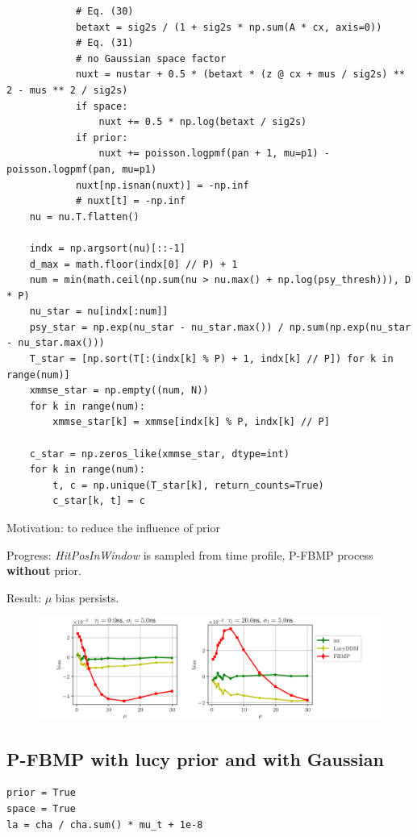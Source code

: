 \documentclass[notitlepage]{article}
\begin{document}
\begin{lstlisting}
            # Eq. (30)
            betaxt = sig2s / (1 + sig2s * np.sum(A * cx, axis=0))
            # Eq. (31)
            # no Gaussian space factor
            nuxt = nustar + 0.5 * (betaxt * (z @ cx + mus / sig2s) ** 2 - mus ** 2 / sig2s)
            if space:
                nuxt += 0.5 * np.log(betaxt / sig2s)
            if prior:
                nuxt += poisson.logpmf(pan + 1, mu=p1) - poisson.logpmf(pan, mu=p1)
            nuxt[np.isnan(nuxt)] = -np.inf
            # nuxt[t] = -np.inf
    nu = nu.T.flatten()

    indx = np.argsort(nu)[::-1]
    d_max = math.floor(indx[0] // P) + 1
    num = min(math.ceil(np.sum(nu > nu.max() + np.log(psy_thresh))), D * P)
    nu_star = nu[indx[:num]]
    psy_star = np.exp(nu_star - nu_star.max()) / np.sum(np.exp(nu_star - nu_star.max()))
    T_star = [np.sort(T[:(indx[k] % P) + 1, indx[k] // P]) for k in range(num)]
    xmmse_star = np.empty((num, N))
    for k in range(num):
        xmmse_star[k] = xmmse[indx[k] % P, indx[k] // P]
    
    c_star = np.zeros_like(xmmse_star, dtype=int)
    for k in range(num):
        t, c = np.unique(T_star[k], return_counts=True)
        c_star[k, t] = c
\end{lstlisting}

Motivation: to reduce the influence of prior

Progress: \textit{HitPosInWindow} is sampled from time profile, P-FBMP process \textbf{without} prior. 

Result: $\mu$ bias persists. 

\begin{figure}[H]
    \centering
    \includegraphics[width=\textwidth]{vs-biasmu-woprior.png}
\end{figure}

\subsection{P-FBMP \textbf{with} lucy prior and \textbf{with} Gaussian}

\begin{lstlisting}
prior = True
space = True
la = cha / cha.sum() * mu_t + 1e-8
\end{lstlisting}
\end{document}
